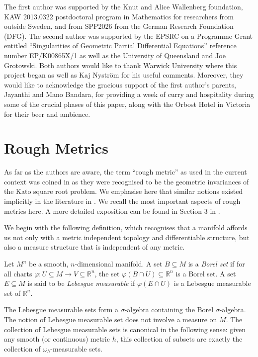 \documentclass[a4paper, 12pt]{amsart}
\numberwithin{equation}{section}
\renewcommand{\~}{\tilde}
\renewcommand{\-}{\bar}
\newcommand{\R}{\mathbb{R}}
\newcommand{\8}{\infty}
\begin{document}
The first author was supported by the Knut and Alice Wallenberg foundation, KAW 2013.0322 
postdoctoral program in Mathematics for researchers from outside Sweden, and from  SPP2026 
from the German Research Foundation (DFG).
The second author was 
supported by the  EPSRC on a Programme Grant entitled ``Singularities of Geometric Partial Differential Equations'' 
reference number EP/K00865X/1 as well as the University of Queensland and Joe Grotowski.
Both authors would like to thank Warwick University where this project began as
well as Kaj Nyström for his useful comments.
Moreover, they would like to acknowledge the gracious support of the first author's 
parents, Jayanthi and Mano Bandara, for providing a week of curry and hospitality during some of the crucial 
phases of this paper, along with the Orbost Hotel in Victoria for their beer and ambience. 

\section{Rough Metrics}
\label{sec:rough_metrics}

As far as the authors are aware, the term ``rough metric'' as used in the current context 
was coined in \cite{BRough} as they were 
recognised to be the geometric invariances of the Kato square root problem.
We emphasise here that similar notions existed implicitly in the 
literature  in \cite{Norris,SC}.
We recall the most important aspects of rough metrics here. 
A more detailed exposition can be found in Section 3 in \cite{BRough}.

We begin with the following definition, which recognises
that a manifold affords us not only with a metric independent 
topology and differentiable structure, but also a measure
structure that is independent of any metric.

\begin{defn}
\label{defn:borel_lebesgue}
Let \(M^n\) be a smooth, \(n\)-dimensional manifold. A set \(B \subseteq M\) is a \emph{Borel set} if for all charts \(\varphi : U \subseteq M \to V \subseteq \R^n\), the set \(\varphi(B \cap U) \subseteq \R^n\) is a Borel set. A set \(E \subseteq M\) is said to be \emph{Lebesgue measurable} if \(\varphi(E \cap U)\) is a Lebesgue measurable set of \(\R^n\).
\end{defn}

\begin{rem}
The Lebesgue measurable sets form a \(\sigma\)-algebra containing the Borel \(\sigma\)-algebra. The notion of Lebesgue measurable set does not involve a measure on \(M\). The collection of Lebesgue measurable sets is canonical in the following sense: given any smooth (or continuous) metric $h$, this collection of subsets are exactly the collection of $\omega_h$-measurable sets.
\end{rem}
\end{document}
